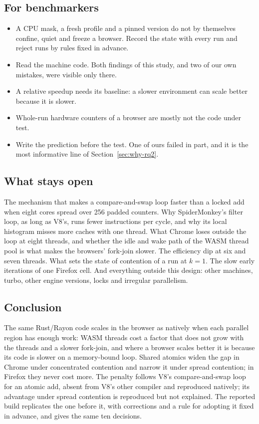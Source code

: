 \subsection{For benchmarkers}

\begin{itemize}[leftmargin=1.5em]
\item A CPU mask, a fresh profile and a pinned version do not by
themselves confine, quiet and freeze a browser. Record the state with every
run and reject runs by rules fixed in advance.
\item Read the machine code. Both findings of this study, and two of our
own mistakes, were visible only there.
\item A relative speedup needs its baseline: a slower environment can
scale better because it is slower.
\item Whole-run hardware counters of a browser are mostly not the code
under test.
\item Write the prediction before the test. One of ours failed in part,
and it is the most informative line of Section~\ref{sec:why-rq2}.
\end{itemize}

\subsection{What stays open}

The mechanism that makes a compare-and-swap loop faster than a locked add
when eight cores spread over 256 padded counters. Why SpiderMonkey's filter
loop, as long as V8's, runs fewer instructions per cycle, and why its local
histogram misses more caches with one thread. What Chrome loses outside the
loop at eight threads, and whether the idle and wake path of the WASM
thread pool is what makes the browsers' fork-join slower. The efficiency
dip at six and seven threads. What sets the state of contention of a run
at $k=1$. The slow early iterations of one Firefox cell. And everything
outside this design: other machines, turbo, other engine versions, locks
and irregular parallelism.

\subsection{Conclusion}

The same Rust/Rayon code scales in the browser as natively when each
parallel region has enough work: WASM threads cost a factor that does not
grow with the threads and a slower fork-join, and where a browser scales better it is
because its code is slower on a memory-bound loop. Shared atomics widen the
gap in Chrome under concentrated contention and narrow it under spread
contention; in Firefox they never cost more. The penalty follows V8's
compare-and-swap loop for an atomic add, absent from V8's other compiler
and reproduced natively; its advantage under spread contention is
reproduced but not explained. The reported build replicates the one before
it, with corrections and a rule for adopting it fixed in advance, and gives
the same ten decisions.
